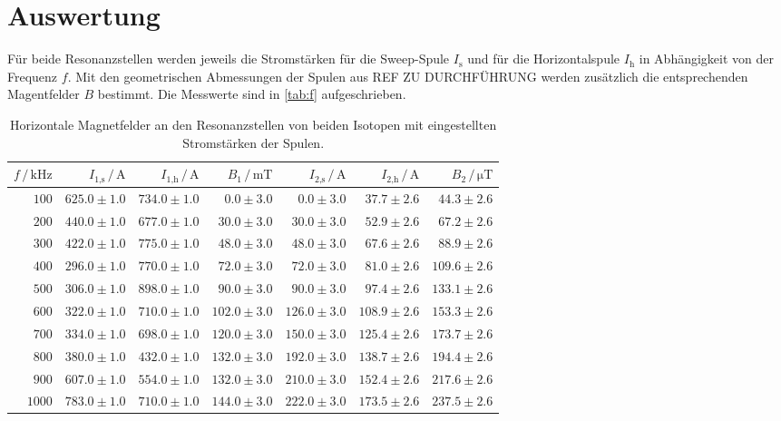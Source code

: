 \section{Auswertung}
\label{sec:Auswertung}


Für beide Resonanzstellen werden jeweils die Stromstärken für die Sweep-Spule $I_\text{s}$ und für die Horizontalspule $I_\text{h}$ in Abhängigkeit von der Frequenz $f$.
Mit den geometrischen Abmessungen der Spulen aus REF ZU DURCHFÜHRUNG werden zusätzlich die entsprechenden Magentfelder $B$ bestimmt.
Die Messwerte sind in \autoref{tab:f} aufgeschrieben.

\begin{table}
    \centering
    \caption{Horizontale Magnetfelder an den Resonanzstellen von beiden Isotopen mit eingestellten Stromstärken der Spulen.}
    \label{tab:f}
    \begin{tabular}{r r r r r r r}
        \toprule
        $f \,/\, \unit{\kilo\hertz}$ & $I_\text{1,s} \,/\, \unit{\ampere}$ & $I_\text{1,h} \,/\, \unit{\ampere}$ & $B_\text{1} \,/\, \unit{\milli\tesla}$ & $I_\text{2,s} \,/\, \unit{\ampere}$ & $I_\text{2,h} \,/\, \unit{\ampere}$ & $B_\text{2} \,/\, \unit{\micro\tesla}$\\
        \midrule
        $100 $ & $625.0\pm1.0$ & $734.0\pm1.0$ & $0.0\pm3.0$ & $0.0\pm3.0$  & $37.7\pm2.6$ & $44.3\pm2.6$ \\
        $200 $ & $440.0\pm1.0$ & $677.0\pm1.0$ & $30.0\pm3.0$ & $30.0\pm3.0$  & $52.9\pm2.6$ & $67.2\pm2.6$ \\
        $300 $ & $422.0\pm1.0$ & $775.0\pm1.0$ & $48.0\pm3.0$ & $48.0\pm3.0$  & $67.6\pm2.6$ & $88.9\pm2.6$ \\
        $400 $ & $296.0\pm1.0$ & $770.0\pm1.0$ & $72.0\pm3.0$  & $72.0\pm3.0 $ & $81.0\pm2.6$ & $109.6\pm2.6$ \\
        $500 $ & $306.0\pm1.0$ & $898.0\pm1.0$ & $90.0\pm3.0$  & $90.0\pm3.0 $ & $97.4\pm2.6$ & $133.1\pm2.6$ \\
        $600 $ & $322.0\pm1.0$ & $710.0\pm1.0$ & $102.0\pm3.0$ & $126.0\pm3.0$ & $108.9\pm2.6$ & $153.3\pm2.6$ \\
        $700 $ & $334.0\pm1.0$ & $698.0\pm1.0$ & $120.0\pm3.0$ & $150.0\pm3.0$ & $125.4\pm2.6$ & $173.7\pm2.6$ \\
        $800 $ & $380.0\pm1.0$ & $432.0\pm1.0$ & $132.0\pm3.0$ & $192.0\pm3.0$ & $138.7\pm2.6$ & $194.4\pm2.6$ \\
        $900 $ & $607.0\pm1.0$ & $554.0\pm1.0$ & $132.0\pm3.0$ & $210.0\pm3.0$ & $152.4\pm2.6$ & $217.6\pm2.6$ \\
        $1000$ & $783.0\pm1.0$ & $710.0\pm1.0$ & $144.0\pm3.0$ & $222.0\pm3.0$ & $173.5\pm2.6$ & $237.5\pm2.6$ \\
        \bottomrule
    \end{tabular}
\end{table}

